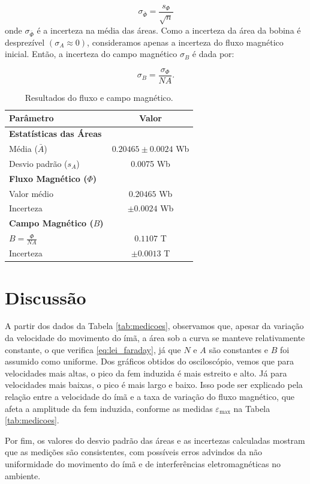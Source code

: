 \documentclass[12pt, a4paper]{article}
\begin{document}
\begin{equation}
    \sigma_{\bar{\Phi}} = \frac{s_\Phi}{\sqrt{n}}
\end{equation}
\noindent onde $\sigma_{\bar{\Phi}}$ é a incerteza na média das áreas. Como a incerteza da área da bobina é desprezível \(\left(\sigma_A \approx 0\right)\), consideramos apenas a incerteza do fluxo magnético inicial. Então, a incerteza do campo magnético \(\sigma_B\) é dada por:

\begin{equation}
    \sigma_B = \frac{\sigma_\Phi}{NA}.
\end{equation}

\begin{table}[H]
\centering
\begin{tabular}{lc}
\toprule
\textbf{Parâmetro} & \textbf{Valor} \\
\midrule
\textbf{Estatísticas das Áreas} & \\
\quad Média ($\bar{A}$) & $0.20465 \pm 0.0024$ Wb \\
\quad Desvio padrão ($s_A$) & 0.0075 Wb \\
\midrule
\textbf{Fluxo Magnético ($\Phi$)} & \\
\quad Valor médio & $0.20465$ Wb \\
\quad Incerteza & $\pm 0.0024$ Wb \\
\midrule
\textbf{Campo Magnético ($B$)} & \\
\quad $B = \frac{\Phi}{NA}$ & $0.1107$ T \\
\quad Incerteza & $\pm 0.0013$ T \\
\bottomrule
\end{tabular}
\caption{Resultados do fluxo e campo magnético.}
\label{tab:resultados}
\end{table}

\section{Discussão}

A partir dos dados da Tabela \ref{tab:medicoes}, observamos que, apesar da variação da velocidade do movimento do ímã, a área sob a curva se manteve relativamente constante, o que verifica \eqref{eq:lei_faraday}, já que \(N\) e \(A\) são constantes e \(B\) foi assumido como uniforme. Dos gráficos obtidos do osciloscópio, vemos que para velocidades mais altas, o pico da fem induzida é mais estreito e alto. Já para velocidades mais baixas, o pico é mais largo e baixo. Isso pode ser explicado pela relação entre a velocidade do ímã e a taxa de variação do fluxo magnético, que afeta a amplitude da fem induzida, conforme as medidas \(\mathcal{\varepsilon}_{\text{max}}\) na Tabela \ref{tab:medicoes}.

Por fim, os valores do desvio padrão das áreas e as incertezas calculadas mostram que as medições são consistentes, com possíveis erros advindos da não uniformidade do movimento do ímã e de interferências eletromagnéticas no ambiente.
\end{document}
